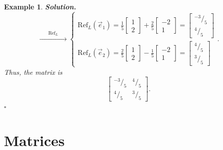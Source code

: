 \documentclass[12pt, a4paper]{article}
\newtheorem{eg}{Example}[subsection]
\newenvironment*{sol}{\indent\textbf{Solution. }}{\hfill{$\square$}\par}
\def\vece{\vec{e}}
\begin{document}
\begin{eg}
\begin{sol}
$$\xrightarrow{\ \ \ \ \ \ \ \ \text{Ref}_L\ \ \ \ \ \ \ \ }\begin{cases}\text{Ref}_L(\vece_1)=\frac{1}{5}\begin{bmatrix}1\\2\end{bmatrix}+\frac{2}{5}\begin{bmatrix}-2\\1\end{bmatrix}=\begin{bmatrix}^{-3}/_5\\^4/_5\end{bmatrix}\\\text{Ref}_L(\vece_2)=\frac{2}{5}\begin{bmatrix}1\\2\end{bmatrix}-\frac{1}{5}\begin{bmatrix}-2\\1\end{bmatrix}=\begin{bmatrix}^4/_5\\^3/_5\end{bmatrix}\end{cases}.$$
Thus, the matrix is 
$$\left[\begin{array}{cc}^{-3}/_{5}&^4/_{5}\\ ^{4}/_{5}&^{3}/_{5}\end{array}\right].$$
\end{sol}
\end{eg}

\newpage
\section{Matrices}
\end{document}
